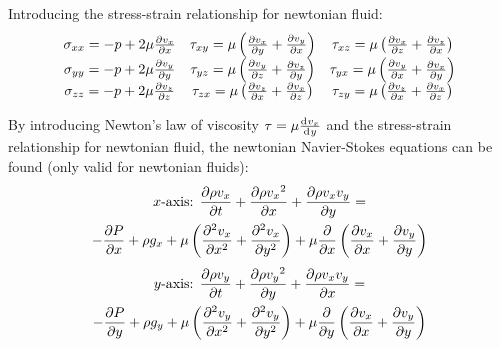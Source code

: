 \documentclass[10pt, twocolumn]{article}
\begin{document}
Introducing the stress-strain relationship for newtonian fluid:
\[
  \begin{matrix}
    \sigma_{xx} = -p + 2\mu\frac{\partial v_x}{\partial x} & \tau_{xy} = \mu\left( \frac{\partial v_x}{\partial y} + \frac{\partial v_y}{\partial x} \right) & \tau_{xz} = \mu\left( \frac{\partial v_x}{\partial z} + \frac{\partial v_z}{\partial x} \right) \\
    \sigma_{yy} = -p + 2\mu\frac{\partial v_y}{\partial y} & \tau_{yz} = \mu\left( \frac{\partial v_y}{\partial z} + \frac{\partial v_z}{\partial y} \right) & \tau_{yx} = \mu\left( \frac{\partial v_y}{\partial x} + \frac{\partial v_x}{\partial y} \right) \\
    \sigma_{zz} = -p + 2\mu\frac{\partial v_z}{\partial z} & \tau_{zx} = \mu\left( \frac{\partial v_z}{\partial x} + \frac{\partial v_x}{\partial z} \right) & \tau_{zy} = \mu\left( \frac{\partial v_z}{\partial x} + \frac{\partial v_x}{\partial z} \right) \\
  \end{matrix}
\]

By introducing Newton's law of viscosity \(\tau = \mu \frac{\mathrm{d}^{} v_x}{\mathrm{d}^{} y}\) and the stress-strain relationship for newtonian fluid, the newtonian Navier-Stokes equations can be found (only valid for newtonian fluids):
\begin{multline*}
  x \text{-axis: } \frac{\partial \rho v_x}{\partial t} + \frac{\partial \rho {v_x}^2}{\partial x} + \frac{\partial \rho v_x v_y}{\partial y} = \\
  -\frac{\partial P}{\partial x} + \rho g_x + \mu \left( \frac{\partial^{2} v_x}{\partial x^{2}} + \frac{\partial^{2} v_x}{\partial y^{2}} \right) + \mu \frac{\partial }{\partial x} \left( \frac{\partial v_x}{\partial x} + \frac{\partial v_y}{\partial y} \right)
\end{multline*}
\begin{multline*}
  y \text{-axis: } \frac{\partial \rho v_y}{\partial t} + \frac{\partial \rho {v_y}^2}{\partial y} + \frac{\partial \rho v_x v_y}{\partial x} = \\
  -\frac{\partial P}{\partial y} + \rho g_y + \mu \left( \frac{\partial^{2} v_y}{\partial x^{2}} + \frac{\partial^{2} v_y}{\partial y^{2}} \right) + \mu \frac{\partial }{\partial y} \left( \frac{\partial v_x}{\partial x} + \frac{\partial v_y}{\partial y} \right)
\end{multline*}
\end{document}
